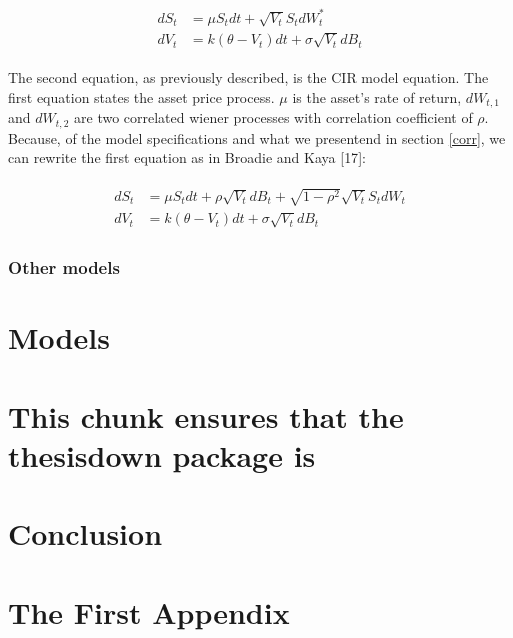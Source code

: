 \documentclass[12pt,twoside]{reedthesis}
\theoremstyle{definition}
\theoremstyle{definition}
\theoremstyle{remark}
\begin{document}
  \begin{align}
  \label{eq:heston}
  \begin{split}
  dS_t &= \mu S_t dt + \sqrt{V_t} S_t dW^*_t \\
  dV_t &= k(\theta - V_t)dt + \sigma \sqrt{V_t} dB_t
  \end{split}
  \end{align}
  
  The second equation, as previously described, is the CIR model equation.
  The first equation states the asset price process. \(\mu\) is the
  asset's rate of return, \(dW_{t,1}\) and \(dW_{t,2}\) are two correlated
  wiener processes with correlation coefficient of \(\rho\). Because, of
  the model specifications and what we presentend in section \ref{corr},
  we can rewrite the first equation as in Broadie and Kaya {[}17{]}:
  
  \begin{align}
  \label{eq:heston2}
  \begin{split}
  dS_t &= \mu S_t dt + \rho \sqrt{V_t} dB_t + \sqrt{1 - \rho^2} \sqrt{V_t} S_t dW_t \\
  dV_t &= k(\theta - V_t)dt + \sigma \sqrt{V_t} dB_t
  \end{split}
  \end{align}
  
  \subsection{Other models}\label{other-models}
  
  \chapter{Models}\label{models}
  
  \chapter{This chunk ensures that the thesisdown package
  is}\label{this-chunk-ensures-that-the-thesisdown-package-is}
  
  \chapter{Conclusion}\label{conclusion}
  
  \chapter{The First Appendix}\label{the-first-appendix}
  
\end{document}
